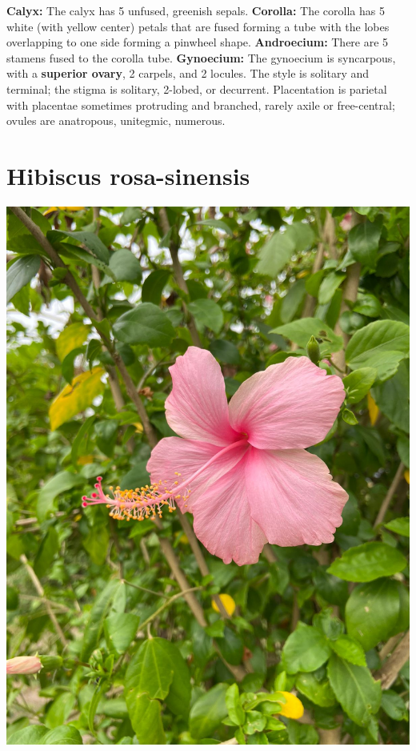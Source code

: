 \documentclass{article}
\begin{document}
\text{ }\newline
\textbf{Calyx:} The calyx has 5 unfused, greenish sepals.\newline
\textbf{Corolla:} The corolla has 5 white (with yellow center) petals that are fused forming a tube with the lobes overlapping to one side forming a pinwheel shape.\newline
\textbf{Androecium:} There are 5 stamens fused to the corolla tube.\newline
\textbf{Gynoecium:} The gynoecium is syncarpous, with a \textbf{superior ovary}, 2 carpels, and 2 locules. The style is solitary and terminal; the stigma is solitary, 2-lobed, or decurrent. Placentation is parietal with placentae sometimes protruding and branched, rarely axile or free-central; ovules are anatropous, unitegmic, numerous.
\section{Hibiscus rosa-sinensis}
\begin{center}
    \includegraphics[scale=0.13]{images/shoe.jpg}
\end{center}
\end{document}
